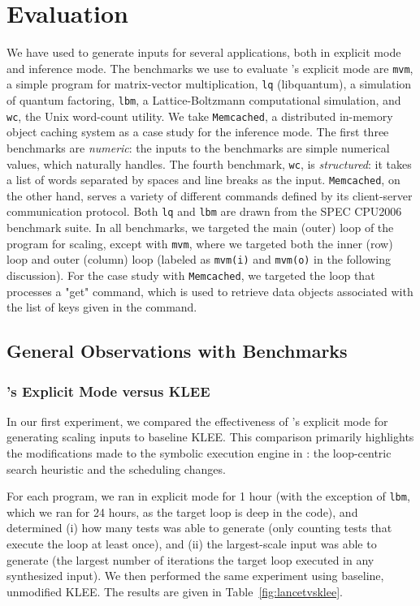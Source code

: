 \section{Evaluation}\label{sec:evaluation}

We have used \lancet to generate inputs for several applications, both in explicit mode and inference mode. The benchmarks we use to evaluate \lancet's explicit mode are {\tt mvm}, a simple program for matrix-vector multiplication, {\tt lq} (libquantum), a simulation of quantum factoring, {\tt lbm}, a Lattice-Boltzmann computational simulation, and {\tt wc}, the Unix word-count utility. We take {\tt Memcached}, a distributed in-memory object caching system as a case study for the inference mode. The first three benchmarks are {\em numeric}: the inputs to the benchmarks are simple numerical values, which \lancet naturally handles. The fourth benchmark, {\tt wc}, is {\em structured}: it takes a list of words separated by spaces and line breaks as the input. {\tt Memcached}, on the other hand, serves a variety of different commands defined by its client-server communication protocol. Both {\tt lq} and {\tt lbm} are drawn from the SPEC CPU2006 benchmark suite. In all benchmarks, we targeted the main (outer) loop of the program for scaling, except with {\tt mvm}, where we targeted both the inner (row) loop and outer (column) loop (labeled as {\tt mvm(i)} and {\tt mvm(o)} in the following discussion). For the case study with {\tt Memcached}, we targeted the loop that processes a "get" command, which is used to retrieve data objects associated with the list of keys given in the command.

\subsection{General Observations with Benchmarks}

\subsubsection{\lancet's Explicit Mode versus KLEE} 

In our first experiment, we compared the effectiveness of \lancet's explicit mode for generating scaling inputs to baseline KLEE. This comparison primarily highlights the modifications made to the symbolic execution engine in \lancet: the loop-centric search heuristic and the scheduling changes.

For each program, we ran \lancet in explicit mode for 1 hour (with the exception of {\tt lbm}, which we ran for 24 hours, as the target loop is deep in the code), and determined (i) how many tests \lancet was able to generate (only counting tests that execute the loop at least once), and (ii) the largest-scale input \lancet was able to generate (\ie the largest number of iterations the target loop executed in any synthesized input). We then performed the same experiment using baseline, unmodified KLEE. The results are given in Table~\ref{fig:lancetvsklee}.

